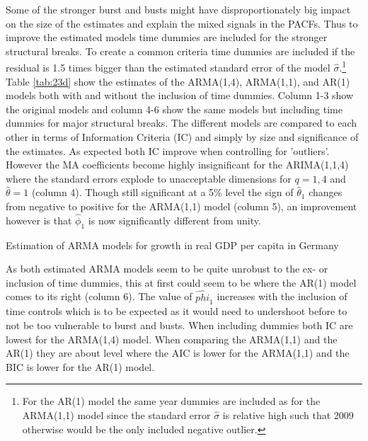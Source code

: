 Some of the stronger burst and busts might have disproportionately big impact on the size of the estimates and explain the mixed signals in the PACFs. Thus to improve the estimated models time dummies are included for the stronger structural breaks. To create a common criteria time dummies are included if the residual is 1.5 times bigger than the estimated standard error of the model $\hat{\sigma}$.\footnote{For the AR(1) model the same year dummies are included as for the ARMA(1,1) model since the standard error $\hat{\sigma}$ is relative high such that 2009 otherwise would be the only included negative outlier.} Table \ref{tab:23d} show the estimates of the ARMA(1,4), ARMA(1,1), and AR(1) models both with and without the inclusion of time dummies. Column 1-3 show the original models and column 4-6 show the same models but including time dummies for major structural breaks. The different models are compared to each other in terms of Information Criteria (IC) and simply by size and significance of the estimates. As expected both IC improve when controlling for 'outliers'. However the MA coefficients become highly insignificant for the ARIMA(1,1,4) where the standard errors explode to unacceptable dimensions for $q=1,4$ and $\hat{\theta}=1$ (column 4). Though still significant at a 5\% level the sign of $\hat{\theta}_1$ changes from negative to positive for the ARMA(1,1) model (column 5), an improvement however is that $\hat{\phi}_1$ is now significantly different from unity.
  \begin{table}[H]
    \centering
    \caption{Estimation of ARMA models for growth in real GDP per capita in Germany}
      
    \label{tab:23d}
  \end{table}\noindent
As both estimated ARMA models seem to be quite unrobust to the ex- or inclusion of time dummies, this at first could seem to be where the AR(1) model comes to its right (column 6). The value of $\hat{phi}_1$ increases with the inclusion of time controls which is to be expected as it would need to undershoot before to not be too vulnerable to burst and busts. When including dummies both IC are lowest for the ARMA(1,4) model. When comparing the ARMA(1,1) and the AR(1) they are about level where the AIC is lower for the ARMA(1,1) and the BIC is lower for the AR(1) model.

